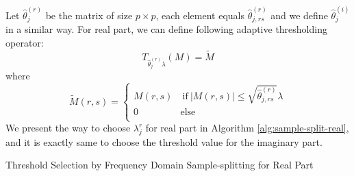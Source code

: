 Let $\hat{\theta}_j^{(r)}$ be the matrix of size $p\times p$, each element equals  $\hat{\theta}^{(r)}_{j, rs}$ and we define $\hat{\theta}_j^{(i)}$ in a similar way.  For real part, we can define following adaptive thresholding operator:
\begin{equation}
T_{\hat{\theta}_j^{(r)}\lambda} (M) = \tilde{M} 
\end{equation}
where 
\begin{equation}
\tilde{M} (r, s) = \begin{cases}
M(r, s) & ~\text{if}~ |M(r, s)| \le \sqrt{\hat{\theta}^{(r)}_{j, rs}}\lambda  \\
0 & \text{else}
\\
\end{cases}
\end{equation}
We present the way to choose $\lambda^r_j$ for real part in Algorithm \ref{alg:sample-split-real}, and it is exactly same to choose the threshold value for the imaginary part. 



\begin{algorithm2e}[t]\small
	\DontPrintSemicolon 
	\caption{Threshold Selection by Frequency Domain Sample-splitting for Real Part}
	\label{alg:sample-split-real}
	\label{al1}
\end{algorithm2e}


